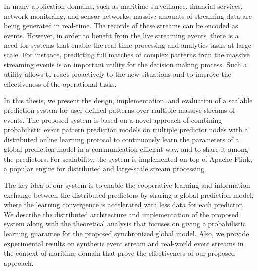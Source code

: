 
\par In many application domains, such as maritime surveillance, financial services, network monitoring, and sensor networks, massive amounts of streaming data are being generated in real-time. The records of these streams can be encoded as events.  However, in order to benefit from the live streaming events, there is a need for systems that enable the real-time processing and analytics tasks at large-scale. For instance, predicting full matches of complex patterns from the massive streaming events is an important utility for the decision making process. Such a utility allows to react proactively to the new situations and to improve the effectiveness of the operational tasks.

\par In this thesis, we present the design, implementation, and evaluation of a scalable prediction system for user-defined patterns over multiple massive streams of events. The proposed system is based on a novel approach of combining probabilistic event pattern prediction models on multiple predictor nodes with a distributed online learning protocol to continuously learn the parameters of a global prediction model in a communication-efficient way, and to share it among the predictors. For  scalability, the system is implemented on top of Apache Flink, a popular engine for distributed and large-scale stream processing.



\par  The key idea of our system is to enable the cooperative learning and information exchange between the distributed predictors by sharing a global prediction model, where the learning convergence is accelerated with less data for each predictor. We describe the distributed architecture and implementation of the proposed system along with the theoretical analysis that focuses on giving a probabilistic learning guarantee for the proposed synchronized global model. Also, we provide experimental results on synthetic event stream and real-world event streams in the context of maritime domain that prove the effectiveness of our proposed approach.



